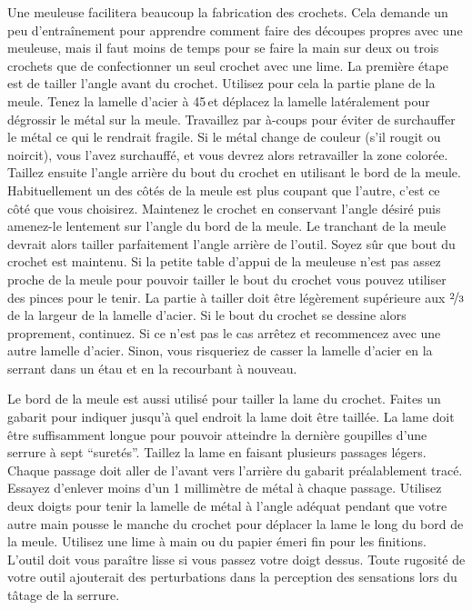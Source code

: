 \documentclass[a4paper,french,11pt,twoside]{report}
\begin{document}
Une meuleuse facilitera beaucoup la fabrication des crochets. Cela demande un peu d'entraînement pour apprendre comment faire des découpes propres avec une meuleuse, mais il faut moins de temps pour se faire la main sur deux ou trois crochets que de confectionner un seul crochet avec une lime. La première étape est de tailler l'angle avant du crochet. Utilisez pour cela la partie plane de la meule. Tenez la lamelle d'acier à 45\degres\,et déplacez la lamelle latéralement pour dégrossir le métal sur la meule. Travaillez par à-coups pour éviter de surchauffer le métal ce qui le rendrait fragile. Si le métal change de couleur (s'il rougit ou noircit), vous l'avez surchauffé, et vous devrez alors retravailler la zone colorée. Taillez ensuite l'angle arrière du bout du crochet en utilisant le bord de la meule. Habituellement un des côtés de la meule est plus coupant que l'autre, c'est ce côté que vous choisirez. Maintenez le crochet en conservant l'angle désiré puis amenez-le lentement sur l'angle du bord de la meule. Le tranchant de la meule devrait alors tailler parfaitement l'angle arrière de l'outil. Soyez sûr que bout du crochet est maintenu. Si la petite table d'appui de la meuleuse n'est pas assez proche de la meule pour pouvoir tailler le bout du crochet vous pouvez utiliser des pinces pour le tenir. La partie à tailler doit être légèrement supérieure aux $\nicefrac{2}{3}$ de la largeur de la lamelle d'acier. Si le bout du crochet se dessine alors proprement, continuez. Si ce n'est pas le cas arrêtez et recommencez avec une autre lamelle d'acier. Sinon, vous risqueriez de casser la lamelle d'acier en la serrant dans un étau et en la recourbant à nouveau.

Le bord de la meule est aussi utilisé pour tailler la lame du crochet. Faites un gabarit pour indiquer jusqu'à quel endroit la lame doit être taillée. La lame doit être suffisamment longue pour pouvoir atteindre la dernière goupilles d'une serrure à sept \enquote{suretés}. Taillez la lame en faisant plusieurs passages légers. Chaque passage doit aller de l'avant vers l'arrière du gabarit préalablement tracé. Essayez d'enlever moins d'un 1 millimètre de métal à chaque passage. Utilisez deux doigts pour tenir la lamelle de métal à l'angle adéquat pendant que votre autre main pousse le manche du crochet pour déplacer la lame le long du bord de la meule.
Utilisez une lime à main ou du papier émeri fin pour les finitions. L'outil doit vous paraître lisse si vous passez votre doigt dessus. Toute rugosité de votre outil ajouterait des perturbations dans la perception des sensations lors du tâtage de la serrure.
\end{document}
